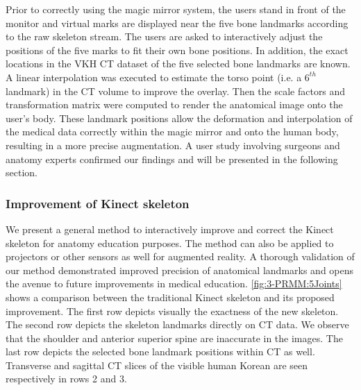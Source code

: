 Prior to correctly using the magic mirror system, the users stand in front of the monitor and virtual marks are displayed near the five bone landmarks according to the raw skeleton stream. The users are asked to interactively adjust the positions of the five marks to fit their own bone positions. In addition, the exact locations in the VKH CT dataset of the five selected bone landmarks are known. A linear interpolation was executed to estimate the torso point (i.e. a $6^{th}$ landmark) in the CT volume to improve the overlay. Then the scale factors and transformation matrix were computed to render the anatomical image onto the user's body. These landmark positions allow the deformation and interpolation of the medical data correctly within the magic mirror and onto the human body, resulting in a more precise augmentation. A user study involving surgeons and anatomy experts confirmed our findings and will be presented in the following section.

\subsubsection{Improvement of Kinect skeleton}
We present a general method to interactively improve and correct the Kinect skeleton for anatomy education purposes. The method can also be applied to projectors or other sensors as well for augmented reality. A thorough validation of our method demonstrated improved precision of anatomical landmarks and opens the avenue to future improvements in medical education. 
\figurename{\ref{fig:3-PRMM:5Joints}} shows a comparison between the traditional Kinect skeleton and its proposed improvement. The first row depicts visually the exactness of the new skeleton. The second row depicts the skeleton landmarks directly on CT data. We observe that the shoulder and anterior superior spine are inaccurate in the images. The last row depicts the selected bone landmark positions within CT as well. Transverse and sagittal CT slices of the visible human Korean are seen respectively in rows 2 and 3.

